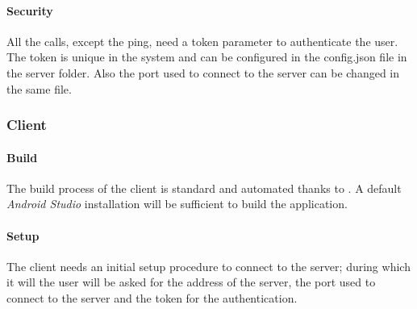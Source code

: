 \documentclass[../PiTest.tex]{subfiles}
\begin{document}
\paragraph{Security}
All the \REST calls, except the ping, need a token parameter to authenticate the user. The token is unique in the system and can be configured in the config.json file in the server folder. Also the port used to connect to the server can be changed in the same file.

\subsubsection{Client}

\paragraph{Build}
The build process of the client is standard and automated thanks to \gradle. A default \textit{Android Studio} installation will be sufficient to build the application.

\paragraph{Setup}
The client needs an initial setup procedure to connect to the server; during which it will the user will be asked for the address of the server, the port used to connect to the server and the token for the authentication.
\end{document}
